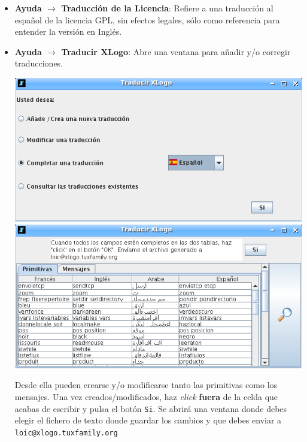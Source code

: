 \begin{itemize}
\begin{center}
      \end{center}
   \item \textbf{Ayuda $\rightarrow$ Traducci\'on de la Licencia}:
       Refiere a una traducci\'on al
      espa\~nol de la licencia GPL, sin efectos legales, s\'olo como
      referencia para entender la versi\'on en Ingl\'es.
   \item \textbf{Ayuda $\rightarrow$ Traducir XLogo}: 
      Abre una ventana para a\~nadir y/o corregir traducciones.
      \begin{center}
         \includegraphics[scale=0.3]{Imagenes/03_Opciones-Menu/Traducir_01.png}
         \hfill
         \includegraphics[scale=0.3]{Imagenes/03_Opciones-Menu/Traducir_02.png}
      \end{center}
      Desde ella pueden crearse y/o modificarse tanto las primitivas como
      los mensajes. Una vez creados/modificados, haz \textit{click} 
      \textbf{fuera} de la celda que acabas de escribir y pulsa el bot\'on 
      \texttt{Si}. Se abrir\'a una ventana donde debes elegir el fichero
      de texto donde guardar los cambios y que debes enviar a
      \texttt{loic@xlogo.tuxfamily.org}
      \begin{center}

\end{center}
\end{itemize}
